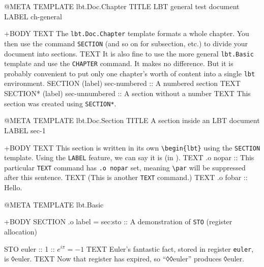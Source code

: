 \documentclass[a4paper,oneside,11pt]{memoir}
\begin{document}
\lbtDraftModeOff{}

\tableofcontents



\begin{lbt}
  @META
    TEMPLATE   lbt.Doc.Chapter
    TITLE      LBT general test document
    LABEL      ch-general

  +BODY
    TEXT The \texttt{lbt.Doc.Chapter} template formats a whole chapter. You then use the command \texttt{SECTION} (and so on for subsection, etc.) to divide your document into sections.
    TEXT It is also fine to use the more general \texttt{lbt.Basic} template and use the \texttt{CHAPTER} command. It makes no difference. But it is probably convenient to put only one chapter's worth of content into a single \texttt{lbt} environment.
    SECTION (label) sec-numbered :: A numbered section
    TEXT \kant[3]
    SECTION* (label) sec-unnumbered :: A section without a number
    TEXT This section was created using \texttt{SECTION*}.
\end{lbt}

\begin{lbt}
  @META
    TEMPLATE   lbt.Doc.Section
    TITLE      A section inside an LBT document
    LABEL      sec-1

  +BODY
    TEXT This section is written in its own \verb|\begin{lbt}| using the \texttt{SECTION} template. Using the \texttt{LABEL} feature, we can say it is  (in ).
    TEXT .o nopar :: This particular \texttt{TEXT} command has \texttt{.o nopar} set, meaning \verb|\par| will be suppressed after this sentence.
    TEXT (This is another \texttt{TEXT} command.)
    TEXT .o fobar :: Hello.
\end{lbt}

\begin{lbt}
  @META
    TEMPLATE lbt.Basic

  +BODY
    SECTION .o label = sec:sto :: A demonstration of \texttt{STO} (register allocation)

    STO euler :: 1 :: $e^{i\pi} = -1$
    TEXT Euler's fantastic fact, stored in register \texttt{euler}, is ◊euler.
    TEXT Now that register has expired, so ``◊◊euler'' produces ◊euler.

\end{lbt}
\end{document}
